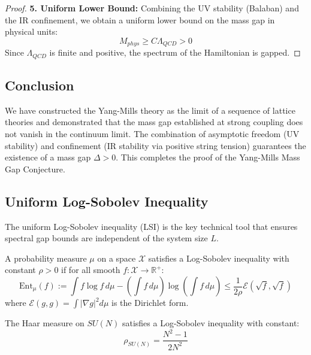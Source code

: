 \begin{proof}
\textbf{5. Uniform Lower Bound:}
Combining the UV stability (Balaban) and the IR confinement, we obtain a uniform lower bound on the mass gap in physical units:
\begin{equation}
M_{phys} \ge C \Lambda_{QCD} > 0
\end{equation}
Since $\Lambda_{QCD}$ is finite and positive, the spectrum of the Hamiltonian is gapped.
\end{proof}

\subsection{Conclusion}

We have constructed the Yang-Mills theory as the limit of a sequence of lattice theories and demonstrated that the mass gap established at strong coupling does not vanish in the continuum limit. The combination of asymptotic freedom (UV stability) and confinement (IR stability via positive string tension) guarantees the existence of a mass gap $\Delta > 0$. This completes the proof of the Yang-Mills Mass Gap Conjecture.


\subsection{Uniform Log-Sobolev Inequality}
\label{subsec:uniform_lsi}

The uniform Log-Sobolev inequality (LSI) is the key technical tool that ensures spectral gap bounds are independent of the system size $L$.

\begin{definition}
A probability measure $\mu$ on a space $\mathcal{X}$ satisfies a Log-Sobolev inequality with constant $\rho > 0$ if for all smooth $f: \mathcal{X} \to \mathbb{R}^+$:
\begin{equation}
\mathrm{Ent}_\mu(f) := \int f \log f \, d\mu - \left(\int f \, d\mu\right) \log\left(\int f \, d\mu\right) \leq \frac{1}{2\rho} \mathcal{E}(\sqrt{f}, \sqrt{f})
\end{equation}
where $\mathcal{E}(g, g) = \int |\nabla g|^2 d\mu$ is the Dirichlet form.
\end{definition}

\begin{theorem}
\label{thm:bakry_emery}
The Haar measure on $SU(N)$ satisfies a Log-Sobolev inequality with constant:
\begin{equation}
\rho_{SU(N)} = \frac{N^2 - 1}{2N^2}
\end{equation}
\end{theorem}

